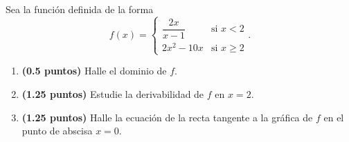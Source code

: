 
Sea la función definida de la forma
\[
f(x)=\begin{cases}
\dfrac{2x}{x-1}&\text{si }x<2\\[0.6em]
2x^2-10x&\text{si }x\geq2
\end{cases}.
\]
\begin{enumerate}[label=\alph*)]
\item \textbf{(0.5 puntos)} Halle el dominio de $f$.
\item \textbf{(1.25 puntos)} Estudie la derivabilidad de $f$ en $x=2$.
\item \textbf{(1.25 puntos)} Halle la ecuación de la recta tangente a la gráfica de $f$ en el punto de abscisa $x=0$.
\end{enumerate}
